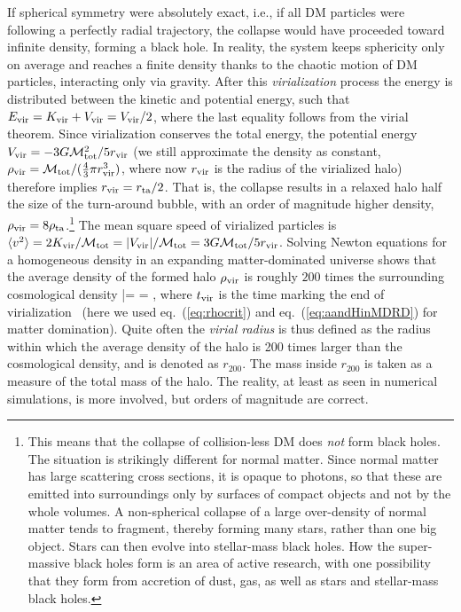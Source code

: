 If spherical symmetry were absolutely exact, i.e., if all DM particles were following a perfectly radial trajectory, the collapse would have proceeded toward infinite density, forming a black hole.
In reality, the system keeps sphericity only on average and reaches a finite density thanks to the chaotic motion of DM particles, interacting only via gravity.
After this {\em virialization} process the energy is distributed between the kinetic and potential energy, such that $E_{\rm vir} = K_{\rm vir} + V_{\rm vir} = V_{\rm vir}/2$, where the last equality follows from the virial theorem. Since virialization conserves the total energy, the potential energy $V_{\rm vir} = -3 G {\mathcal{M}} _{\rm tot}^2/5r_{\rm vir}$ 
(we still approximate the density as constant, $\rho_{\rm vir} = {\mathcal{M}} _{\rm tot}/(\frac43\pi r_{\rm vir}^3)$,
where now $r_{\rm vir}$ is the radius of the virialized halo) therefore implies $r_{\rm vir} = r_{\rm ta}/2$. That is, 
the collapse results in a relaxed halo half the size of the turn-around bubble, 
with an order of magnitude higher density, $\rho_{\rm vir}=8\rho_{\rm ta}$.\footnote{
This means that the collapse of collision-less DM does {\em not} form black holes.
The situation is strikingly different for normal matter. 
Since normal matter has large scattering cross sections, it is opaque to photons, 
so that these are emitted into surroundings only by surfaces of compact objects and not by the whole volumes. 
A non-spherical collapse of a large over-density of normal
matter  tends to fragment, thereby  forming many stars, rather than one big object.
Stars can then evolve into stellar-mass black holes. 
How the super-massive black holes form is an area of active research, 
with one possibility that they form from accretion of dust, gas, as well as stars and stellar-mass black holes.
}
The mean square speed of virialized particles is $\langle v^2 \rangle = 2 K_{\rm vir}/{\mathcal{M}} _{\rm tot}= |V_{\rm vir}|/{\mathcal{M}} _{\rm tot} = 3G {\mathcal{M}} _{\rm tot}/5r_{\rm vir}$. 
Solving Newton equations for a homogeneous density in an expanding matter-dominated universe
shows that the average density of the formed halo $\rho_{\rm vir}$  is roughly $ 200$ times the 
surrounding cosmological density 
\beq\label{eq:rhovir}
\bar \rho =  = ,\eeq
where $t_{\rm vir}$ is the time marking the end of virialization~\cite{books_galaxy_formation}
(here we used eq.~(\ref{eq:rhocrit}) and eq.~(\ref{eq:aandHinMDRD}) for matter domination). 
Quite often the {\em virial radius} is thus defined as the radius within which the average density of the halo is 200 times larger than the cosmological density,  
and is denoted as $r_{200}$. 
The mass inside $r_{200}$ is taken as a measure of the total mass of the halo.
The reality, at least as seen in numerical simulations, is more involved, but orders of magnitude are correct.



